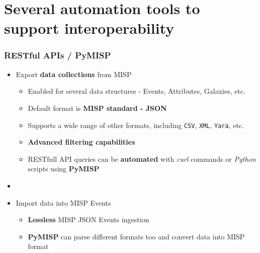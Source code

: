 \section{Several automation tools to \\ support interoperability}

\begin{frame}
    \frametitle{RESTful APIs / PyMISP}
    \begin{itemize}
        \item Export \textbf{data collections} from MISP
        \begin{itemize}
            \item Enabled for several data structures - Events, Attributes, Galaxies, etc.
            \item Default format is \textbf{MISP standard - JSON}
            \item Supports a wide range of other formats, including \texttt{CSV}, \texttt{XML}, \texttt{Yara}, etc.
            \item \textbf{Advanced filtering capabilities}
            \item RESTfull API queries can be \textbf{automated} with \textit{curl} commands or \textit{Python} scripts using \textbf{PyMISP}
        \end{itemize}
        \item []
        \item Import data into MISP Events
        \begin{itemize}
            \item \textbf{Lossless} MISP JSON Events ingestion
            \item \textbf{PyMISP} can parse different formats too and convert data into MISP format
        \end{itemize}
    \end{itemize}
\end{frame}

